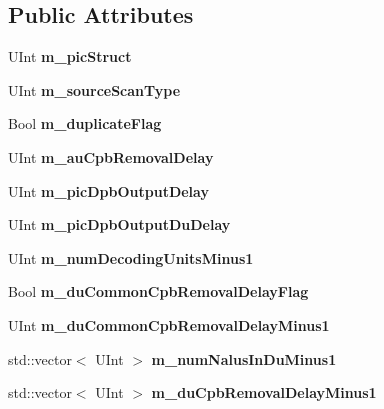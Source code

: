 \subsection*{Public Attributes}
\begin{DoxyCompactItemize}
\item 
\mbox{\label{class_s_e_i_picture_timing_a48acb61c95f03928d784bab8c394e3af}} 
U\+Int {\bfseries m\+\_\+pic\+Struct}
\item 
\mbox{\label{class_s_e_i_picture_timing_a6a6b7a3546aecbf1db2c1603c2f2fc9a}} 
U\+Int {\bfseries m\+\_\+source\+Scan\+Type}
\item 
\mbox{\label{class_s_e_i_picture_timing_a5f977d2aead15d352220bf866503764f}} 
Bool {\bfseries m\+\_\+duplicate\+Flag}
\item 
\mbox{\label{class_s_e_i_picture_timing_a02064be79d611578130e24d26bd89862}} 
U\+Int {\bfseries m\+\_\+au\+Cpb\+Removal\+Delay}
\item 
\mbox{\label{class_s_e_i_picture_timing_a17945d3222b3aa42ded6aa54790b5436}} 
U\+Int {\bfseries m\+\_\+pic\+Dpb\+Output\+Delay}
\item 
\mbox{\label{class_s_e_i_picture_timing_a19a99ac22675810aff85eeeffe9b4bf4}} 
U\+Int {\bfseries m\+\_\+pic\+Dpb\+Output\+Du\+Delay}
\item 
\mbox{\label{class_s_e_i_picture_timing_a14df24fa63fdf5d1e204a973e5cc4b36}} 
U\+Int {\bfseries m\+\_\+num\+Decoding\+Units\+Minus1}
\item 
\mbox{\label{class_s_e_i_picture_timing_a0116b1ad261dddb2d4713690a332e61b}} 
Bool {\bfseries m\+\_\+du\+Common\+Cpb\+Removal\+Delay\+Flag}
\item 
\mbox{\label{class_s_e_i_picture_timing_a8b773f42422b0064057230e48645375c}} 
U\+Int {\bfseries m\+\_\+du\+Common\+Cpb\+Removal\+Delay\+Minus1}
\item 
\mbox{\label{class_s_e_i_picture_timing_a03b5a987d99a57eb9388c9ea09fbc1d5}} 
std\+::vector$<$ U\+Int $>$ {\bfseries m\+\_\+num\+Nalus\+In\+Du\+Minus1}
\item 
\mbox{\label{class_s_e_i_picture_timing_accfac0d457891221ef51ec2b71b2eef3}} 
std\+::vector$<$ U\+Int $>$ {\bfseries m\+\_\+du\+Cpb\+Removal\+Delay\+Minus1}
\end{DoxyCompactItemize}
